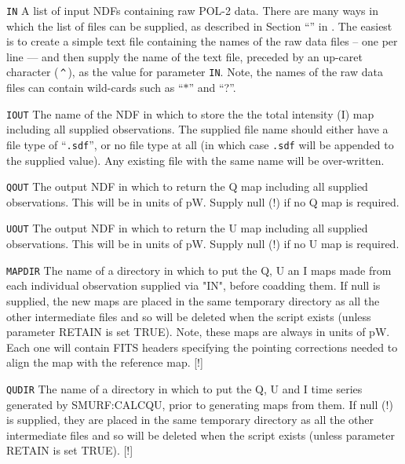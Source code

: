 \begin{aligndesc}
\item[\texttt{IN}] A list of input NDFs containing raw POL-2 data. 
There are many ways in which the list of files can be supplied,
as described in Section ``''
in . The easiest is to create a simple text
file containing the names of the raw data files -- one per line --- and
then supply the name of the text file, preceded by an up-caret character
(\,\texttt{\^{}}\,), as the value for parameter \texttt{IN}. Note, the names of
the raw data files can contain wild-cards such as ``$*$'' and ``?''.

\item[\texttt{IOUT}] 
The name of the NDF in which to store the the total intensity (I) map
including all supplied observations. The supplied file name should either have a file type of
``\texttt{.sdf}'', or no file type at all (in which case \texttt{.sdf}
will be appended to the supplied value). Any existing file with the same
name will be over-written.

\item[\texttt{QOUT}] 
The output NDF in which to return the Q map including all supplied
observations. This will be in units of pW. Supply null (!) if no Q
map is required.


\item[\texttt{UOUT}] 
The output NDF in which to return the U map including all supplied
observations. This will be in units of pW. Supply null (!) if no U
map is required.

\item[\texttt{MAPDIR}] 
The name of a directory in which to put the Q, U an I maps made
from each individual observation supplied via "IN", before
coadding them. If
null is supplied, the new maps are placed in the same temporary
directory as all the other intermediate files and so will be
deleted when the script exists (unless parameter RETAIN is set
TRUE). Note, these maps are always in units of pW. Each one will
contain FITS headers specifying the pointing corrections needed
to align the map with the reference map. [!]


\item[\texttt{QUDIR}] 
The name of a directory in which to put the Q, U and I time series
generated by SMURF:CALCQU, prior to generating maps from them. If
null (!) is supplied, they are placed in the same temporary directory
as all the other intermediate files and so will be deleted when the
script exists (unless parameter RETAIN is set TRUE). [!]


\end{aligndesc}

